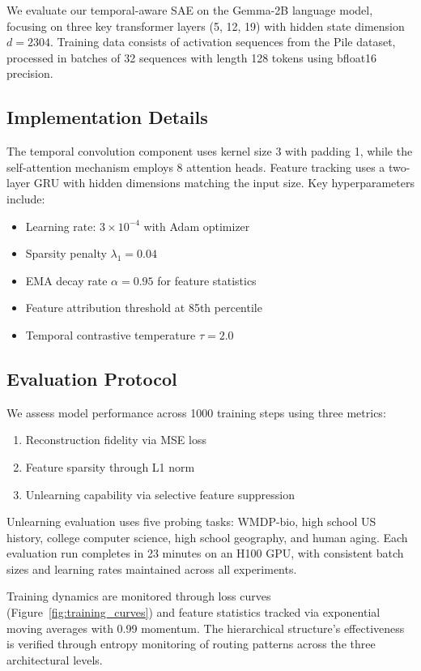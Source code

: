 \documentclass{article} %
\begin{document}
We evaluate our temporal-aware SAE on the Gemma-2B language model, focusing on three key transformer layers (5, 12, 19) with hidden state dimension $d=2304$. Training data consists of activation sequences from the Pile dataset, processed in batches of 32 sequences with length 128 tokens using bfloat16 precision.

\subsection{Implementation Details}
The temporal convolution component uses kernel size 3 with padding 1, while the self-attention mechanism employs 8 attention heads. Feature tracking uses a two-layer GRU with hidden dimensions matching the input size. Key hyperparameters include:
\begin{itemize}
    \item Learning rate: $3\times10^{-4}$ with Adam optimizer
    \item Sparsity penalty $\lambda_1=0.04$
    \item EMA decay rate $\alpha=0.95$ for feature statistics
    \item Feature attribution threshold at 85th percentile
    \item Temporal contrastive temperature $\tau=2.0$
\end{itemize}

\subsection{Evaluation Protocol}
We assess model performance across 1000 training steps using three metrics:
\begin{enumerate}
    \item Reconstruction fidelity via MSE loss
    \item Feature sparsity through L1 norm
    \item Unlearning capability via selective feature suppression
\end{enumerate}

Unlearning evaluation uses five probing tasks: WMDP-bio, high school US history, college computer science, high school geography, and human aging. Each evaluation run completes in 23 minutes on an H100 GPU, with consistent batch sizes and learning rates maintained across all experiments.

Training dynamics are monitored through loss curves (Figure~\ref{fig:training_curves}) and feature statistics tracked via exponential moving averages with 0.99 momentum. The hierarchical structure's effectiveness is verified through entropy monitoring of routing patterns across the three architectural levels.
\end{document}
